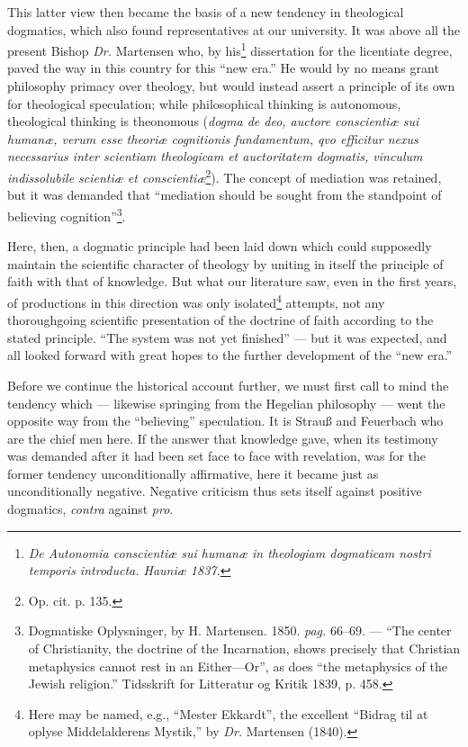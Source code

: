 \documentclass[12pt,a4paper]{book}
\newcommand{\opage}[1]{\marginnote{\footnotesize\textit{[#1]}}}
\begin{document}
This latter view then became the basis of a new tendency in theological
dogmatics, which also found representatives at our university. It was above
all the present Bishop
\opage{16}\setcounter{footnote}{0}%
\textit{Dr.} Martensen who, by his\footnote{\textit{De Autonomia
conscientiæ sui humanæ in theologiam dogmaticam nostri temporis introducta.
Hauniæ 1837.}} dissertation for the licentiate degree, paved the way in this
country for this ``new era.'' He would by no means grant philosophy primacy over
theology, but would instead assert a principle of its own for theological
speculation; while philosophical thinking is autonomous, theological thinking
is theonomous (\textit{dogma de deo, auctore conscientiæ sui humanæ,
verum esse theoriæ cognitionis fundamentum, qvo efficitur nexus necessarius
inter scientiam theologicam et auctoritatem dogmatis, vinculum indissolubile
scientiæ et conscientiæ}\footnote{Op. cit. p. 135.}).
The concept of mediation was retained, but it was demanded that ``mediation
should be sought from the standpoint of believing cognition''\footnote{Dogmatiske
Oplysninger, by H. Martensen. 1850. \textit{pag.} 66--69. --- ``The center of
Christianity, the doctrine of the Incarnation, shows precisely that Christian
metaphysics cannot rest in an Either---Or'', as does ``the metaphysics of the
Jewish religion.'' Tidsskrift for Litteratur og Kritik 1839, p. 458.}.

Here, then, a dogmatic principle had been laid down which could supposedly
maintain the scientific character of theology by uniting in itself the
principle of faith with that of knowledge. But what our literature saw, even in
the first years, of productions in this direction was only isolated\footnote{Here
may be named, e.g., ``Mester Ekkardt'', the excellent ``Bidrag til at oplyse
Middelalderens Mystik,'' by \textit{Dr.} Martensen (1840).} attempts, not any
thoroughgoing scientific presentation of the doctrine of faith according to
the stated principle. ``The system was not yet finished'' --- but it was
expected, and all looked forward with great hopes to the further development
of the ``new era.''

Before we continue the historical account further, we must first call to mind
the tendency which --- likewise springing from the Hegelian philosophy --- went
the opposite way from the ``believing'' speculation. It is Strauß and
\opage{17}\setcounter{footnote}{0}%
Feuerbach who are the chief men here. If the answer that knowledge gave, when
its testimony was demanded after it had been set face to face with revelation,
was for the former tendency unconditionally affirmative, here it became just
as unconditionally negative. Negative criticism thus sets itself against
positive dogmatics, \textit{contra} against \textit{pro}.
\end{document}
